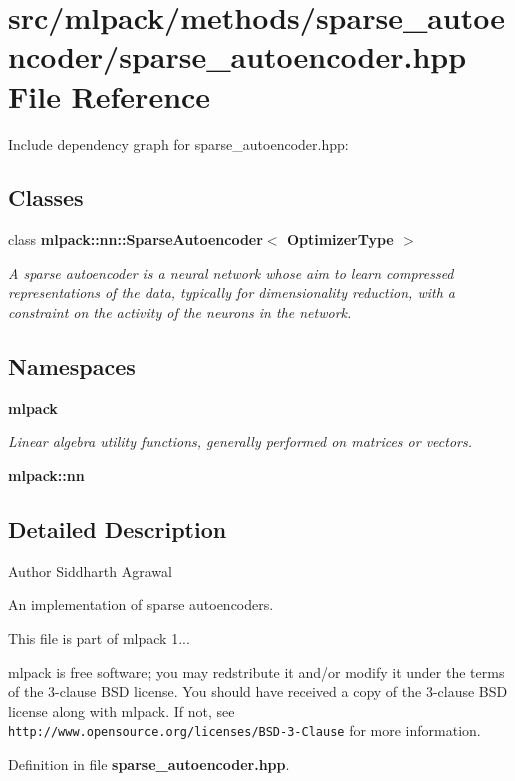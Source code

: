 \section{src/mlpack/methods/sparse\-\_\-autoencoder/sparse\-\_\-autoencoder.hpp File Reference}
\label{sparse__autoencoder_8hpp}
Include dependency graph for sparse\-\_\-autoencoder.\-hpp\-:
\subsection*{Classes}
\begin{DoxyCompactItemize}
\item 
class {\bf mlpack\-::nn\-::\-Sparse\-Autoencoder$<$ Optimizer\-Type $>$}
\begin{DoxyCompactList}\small\item\em A sparse autoencoder is a neural network whose aim to learn compressed representations of the data, typically for dimensionality reduction, with a constraint on the activity of the neurons in the network. \end{DoxyCompactList}\end{DoxyCompactItemize}
\subsection*{Namespaces}
\begin{DoxyCompactItemize}
\item 
{\bf mlpack}
\begin{DoxyCompactList}\small\item\em Linear algebra utility functions, generally performed on matrices or vectors. \end{DoxyCompactList}\item 
{\bf mlpack\-::nn}
\end{DoxyCompactItemize}


\subsection{Detailed Description}
\begin{DoxyAuthor}{Author}
Siddharth Agrawal
\end{DoxyAuthor}
An implementation of sparse autoencoders.

This file is part of mlpack 1...

mlpack is free software; you may redstribute it and/or modify it under the terms of the 3-\/clause B\-S\-D license. You should have received a copy of the 3-\/clause B\-S\-D license along with mlpack. If not, see {\tt http\-://www.\-opensource.\-org/licenses/\-B\-S\-D-\/3-\/\-Clause} for more information. 

Definition in file {\bf sparse\-\_\-autoencoder.\-hpp}.

